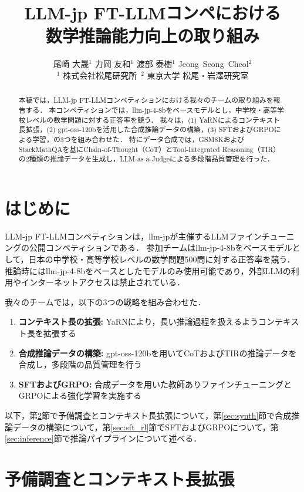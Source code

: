 \documentclass[
  platex, dvipdfmx,  %
]{nlp2026}
\title{LLM-jp FT-LLMコンペにおける\\数学推論能力向上の取り組み}
\author{%
  尾崎 大晟${}^{1}$ \quad
  力岡 友和${}^{1}$ \quad
  渡部 泰樹${}^{1}$ \quad
  Jeong~Seong~Cheol${}^{2}$\\[4pt]
  ${}^{1}$ 株式会社松尾研究所\
  ${}^{2}$ 東京大学 松尾・岩澤研究室
}
\begin{document}
\maketitle
\begin{abstract}
本稿では，LLM-jp FT-LLMコンペティションにおける我々のチームの取り組みを報告する．
本コンペティションでは，llm-jp-4-8bをベースモデルとし，中学校・高等学校レベルの数学問題に対する正答率を競う．
我々は，(1) YaRNによるコンテキスト長拡張，(2) gpt-oss-120bを活用した合成推論データの構築，(3) SFTおよびGRPOによる学習，の3つを組み合わせた．
特にデータ合成では，GSM8KおよびStackMathQAを基にChain-of-Thought（CoT）とTool-Integrated Reasoning（TIR）の2種類の推論データを生成し，LLM-as-a-Judgeによる多段階品質管理を行った．
\end{abstract}

\section{はじめに}

LLM-jp FT-LLMコンペティション\cite{ftllm2026}は，llm-jpが主催するLLMファインチューニングの公開コンペティションである．
参加チームはllm-jp-4-8bをベースモデルとして，日本の中学校・高等学校レベルの数学問題500問に対する正答率を競う．
推論時にはllm-jp-4-8bをベースとしたモデルのみ使用可能であり，外部LLMの利用やインターネットアクセスは禁止されている．

我々のチームでは，以下の3つの戦略を組み合わせた．
\begin{enumerate}
\item \textbf{コンテキスト長の拡張:} YaRN\cite{yarn}により，長い推論過程を扱えるようコンテキスト長を拡張する
\item \textbf{合成推論データの構築:} gpt-oss-120bを用いてCoTおよびTIRの推論データを合成し，多段階の品質管理を行う
\item \textbf{SFTおよびGRPO:} 合成データを用いた教師ありファインチューニングとGRPOによる強化学習を実施する
\end{enumerate}

以下，第\ref{sec:baseline}節で予備調査とコンテキスト長拡張について，第\ref{sec:synth}節で合成推論データの構築について，第\ref{sec:sft_rl}節でSFTおよびGRPOについて，第\ref{sec:inference}節で推論パイプラインについて述べる．

\section{予備調査とコンテキスト長拡張}
\label{sec:baseline}
\label{sec:context}
\end{document}
